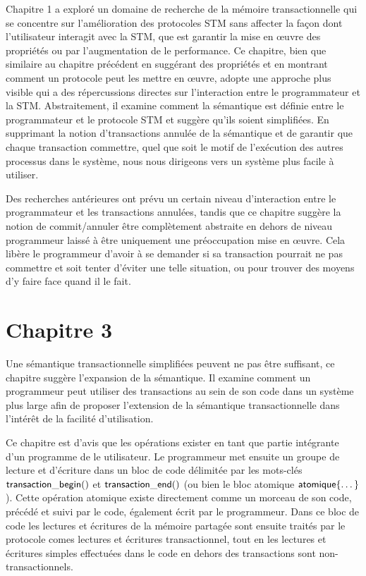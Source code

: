 Chapitre 1 a exploré un domaine de recherche de la mémoire transactionnelle qui se concentre sur
l'amélioration des protocoles STM sans affecter la façon dont l'utilisateur interagit avec la STM,
que est garantir la mise en œuvre des propriétés ou par l'augmentation de le performance.
Ce chapitre, bien que similaire au chapitre précédent en suggérant des propriétés et en montrant comment un protocole peut les mettre en œuvre,
adopte une approche plus visible qui a des répercussions directes sur l'interaction entre le programmateur et la STM.
Abstraitement, il examine comment la sémantique est définie entre le programmateur et le protocole STM et suggère qu'ils soient simplifiées.
En supprimant la notion d'transactions annulée de la sémantique et de garantir que chaque transaction commettre,
quel que soit le motif de l'exécution des autres processus dans le système, nous nous dirigeons vers un système plus facile à utiliser.


Des recherches antérieures ont prévu un certain niveau d'interaction entre le programmateur et les transactions annulées,
tandis que ce chapitre suggère la notion de commit/annuler être complètement abstraite en dehors de niveau programmeur laissé à être uniquement une préoccupation mise en œuvre.
Cela libère le programmeur d'avoir à se demander si sa transaction pourrait ne pas commettre et soit tenter d'éviter une telle situation, ou pour trouver des moyens d'y faire face quand il le fait.


\section{Chapitre 3}

Une sémantique transactionnelle simplifiées peuvent ne pas être suffisant, ce chapitre suggère l'expansion de la sémantique.
Il examine comment un programmeur peut utiliser des transactions au sein de son code dans un système plus large afin de proposer
l'extension de la sémantique transactionnelle dans l'intérêt de la facilité d'utilisation.


Ce chapitre est d'avis que les opérations exister en tant que partie intégrante d'un programme de le utilisateur.
Le programmeur met ensuite un groupe de lecture et d'écriture dans un bloc de code délimitée par les mots-clés
$\act{transaction\_begin}()$ et $\act{transaction\_end}()$ (ou bien le bloc atomique $\act{atomique}\{ \dots \} $).
Cette opération atomique existe directement comme un morceau de son code, précédé et suivi par le code, également écrit par le programmeur.
Dans ce bloc de code les lectures et écritures de la mémoire partagée sont ensuite traités par le protocole comes lectures et écritures transactionnel,
tout en les lectures et écritures simples effectuées dans le code en dehors des transactions sont non-transactionnels.


